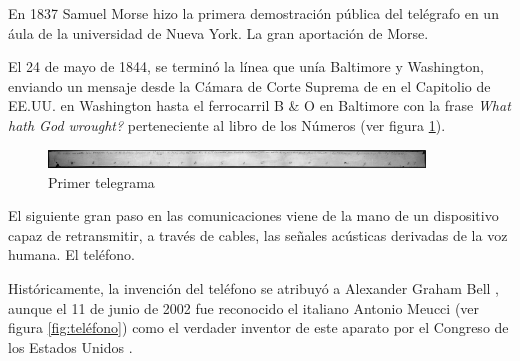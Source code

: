 En 1837 Samuel Morse hizo la primera demostración pública del telégrafo en un áula de la universidad de Nueva York. La gran aportación de Morse.

El 24 de mayo de 1844, se terminó la línea que unía Baltimore y Washington, enviando un mensaje desde la Cámara de Corte Suprema de en el Capitolio de \ac{EE.UU.} en Washington hasta el ferrocarril B \& O en Baltimore con la frase \textit{What hath God wrought?} perteneciente al libro de los Números (ver figura \ref{fig:telegrama}).

\begin{figure}[h!btp]
\centering
\includegraphics[width=100mm, fbox={\fboxrule} 4mm]{images/03-antecedentes/19-primer_telegrama.jpg}
\caption{Primer telegrama}
\label{fig:telegrama}
\end{figure}

El siguiente gran paso en las comunicaciones viene de la mano de un dispositivo capaz de retransmitir, a través de cables, las señales acústicas derivadas de la voz humana. El teléfono.

Históricamente, la invención del teléfono se atribuyó a Alexander Graham Bell \cite{Cab79}, aunque el 11 de junio de 2002 fue reconocido el italiano Antonio Meucci (ver figura \ref{fig:teléfono}) como el verdader inventor de este aparato por el Congreso de los Estados Unidos \cite{Uni03}.

